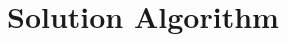 \documentclass[12 pt]{article}
\begin{document}
% 
% 
% 
% 

\newpage




\appendix
\section{Solution Algorithm}
\label{sec:sol_alg}
\end{document}
